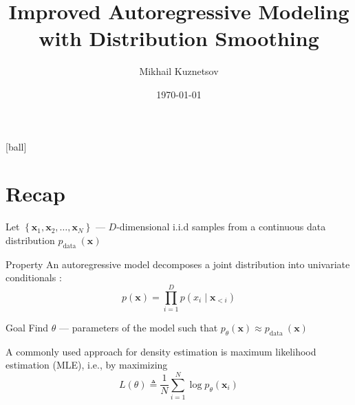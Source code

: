\documentclass[t]{beamer}  %
\title{Improved Autoregressive Modeling with Distribution Smoothing}
\author[Махин Артем \\ Кузнецов Михаил]{Mikhail Kuznetsov}
\date{\today}
\institute[МГУ]{CMC MSU}
\begin{document}
\frame[plain]{\titlepage}	%
[ball]


\section{Recap}
\begin{frame}

Let $\left\{\bm{x}_{1}, \bm{x}_{2}, \ldots, \bm{x}_{N}\right\}$ --- $D$-dimensional i.i.d samples from a continuous data distribution $p_{\text {data }}(\bm{x})$

\begin{exampleblock}{Property}
An autoregressive model decomposes a joint distribution into univariate conditionals \cite{autoreg}:
$$
p(\bm{x})=\prod_{i=1}^{D} p\left(x_{i} \mid \bm{x}_{<i}\right)
$$
\end{exampleblock}

\begin{block}{Goal}
Find $\theta$ --- parameters of the model such that $p_{\theta}(\bm{x}) \approx p_{\text {data }}(\bm{x})$ 
\end{block}

A commonly used approach for density estimation is maximum likelihood estimation (MLE), i.e., by maximizing 
$$
L(\theta) \triangleq \frac{1}{N} \sum_{i=1}^{N} \log p_{\theta}\left(\bm{x}_{i}\right)
$$
\end{frame}
\end{document}

